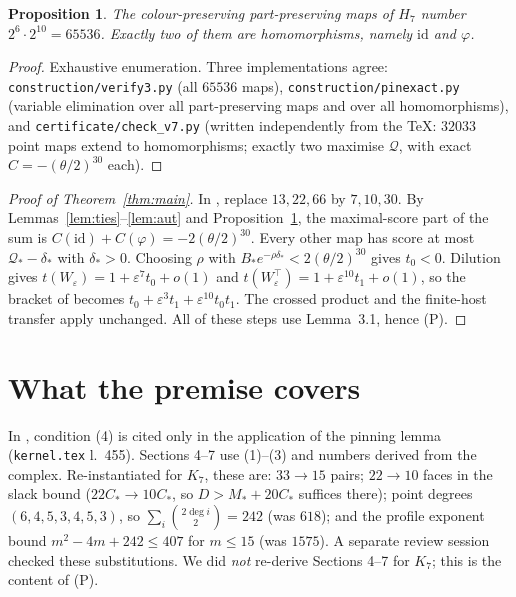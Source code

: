 \documentclass[11pt]{amsart}
\newtheorem{proposition}[theorem]{Proposition}
\theoremstyle{definition}
\theoremstyle{remark}
\newcommand{\1}{\mathbf 1}
\begin{document}
\begin{proposition}\label{prop:maxhom}
The colour-preserving part-preserving maps of $H_7$ number $2^6\cdot2^{10}=65536$. Exactly two of them are homomorphisms,
namely $\mathrm{id}$ and $\varphi$.
\end{proposition}
\begin{proof}
Exhaustive enumeration. Three implementations agree: \texttt{construction/verify3.py} (all $65536$ maps),
\texttt{construction/pinexact.py} (variable elimination over all part-preserving maps and over all
homomorphisms), and \texttt{certificate/check\_v7.py} (written independently from the \TeX: $32033$ point maps
extend to homomorphisms; exactly two maximise $\mathcal Q$, with exact $C=-(\theta/2)^{30}$ each).
\end{proof}

\begin{proof}[Proof of Theorem~\ref{thm:main}]
In \cite[(3.21)]{oai}, replace $13,22,66$ by $7,10,30$. By Lemmas~\ref{lem:ties}--\ref{lem:aut} and
Proposition~\ref{prop:maxhom}, the maximal-score part of the sum is $C(\mathrm{id})+C(\varphi)=-2(\theta/2)^{30}$. Every other
map has score at most $\mathcal Q_*-\delta_*$ with $\delta_*>0$. Choosing $\rho$ with $B_*e^{-\rho\delta_*}<2(\theta/2)^{30}$ gives $t_0<0$. Dilution gives
$t(W_\varepsilon)=1+\varepsilon^{7}t_0+o(1)$ and $t(W_\varepsilon^\top)=1+\varepsilon^{10}t_1+o(1)$, so the bracket of
\cite[(3.25)]{oai} becomes $t_0+\varepsilon^3t_1+\varepsilon^{10}t_0t_1$. The crossed product and the finite-host transfer
\cite[Prop.~3.5, Lemma~3.6]{oai} apply unchanged. All of these steps use Lemma~3.1, hence (P).
\end{proof}

\section{What the premise covers}\label{sec:premise}
In \cite{oai}, condition (4) is cited only in the application of the pinning lemma (\texttt{kernel.tex} l.~455).
Sections 4--7 use (1)--(3) and numbers derived from the complex. Re-instantiated for $K_7$, these are:
$33\to15$ pairs; $22\to10$ faces in the slack bound \cite[\S7]{oai} ($22C_*\to10C_*$, so
$D>M_*+20C_*$ suffices there); point degrees $(6,4,5,3,4,5,3)$, so $\sum_i\binom{2\deg i}{2}=242$ (was $618$); and the
profile exponent bound $m^2-4m+242\le407$ for $m\le15$ (was $1575$). A separate review session checked these
substitutions. We did \emph{not} re-derive Sections 4--7 for $K_7$; this is the content of (P).
\end{document}
